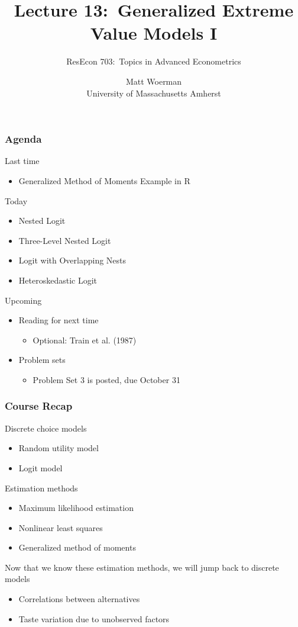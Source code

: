 \documentclass{beamer}
\title[Lecture 13:\ Generalized Extreme Value Models I]{Lecture 13:\ Generalized Extreme Value Models I}
\author[ResEcon 703:\ Advanced Econometrics]{ResEcon 703:\ Topics in Advanced Econometrics}
\date{Matt Woerman\\University of Massachusetts Amherst}
\begin{document}
{ 
\begin{frame}[noframenumbering]
    \titlepage
\end{frame}
}

\begin{frame}\frametitle{Agenda}
    Last time
    \begin{itemize}
        \item Generalized Method of Moments Example in R
    \end{itemize}
    \vspace{2ex}
    Today
    \begin{itemize}
    	\item Nested Logit
    	\item Three-Level Nested Logit
    	\item Logit with Overlapping Nests
    	\item Heteroskedastic Logit
    \end{itemize}
    \vspace{2ex}
    Upcoming
    \begin{itemize}
        \item Reading for next time
        \begin{itemize}
            \item Optional: Train et al. (1987)
        \end{itemize}
        \item Problem sets
        \begin{itemize}
            \item Problem Set 3 is posted, due October 31
        \end{itemize}
    \end{itemize}
\end{frame}

\begin{frame}\frametitle{Course Recap}
    Discrete choice models
    \begin{itemize}
    	\item Random utility model
    	\item Logit model
    \end{itemize}
    \vspace{2ex}
    Estimation methods
    \begin{itemize}
    	\item Maximum likelihood estimation
    	\item Nonlinear least squares
    	\item Generalized method of moments
    \end{itemize}
    \vspace{2ex}
    Now that we know these estimation methods, we will jump back to discrete models
    \begin{itemize}
    	\item Correlations between alternatives
    	\item Taste variation due to unobserved factors
    \end{itemize}
\end{frame}
\end{document}
